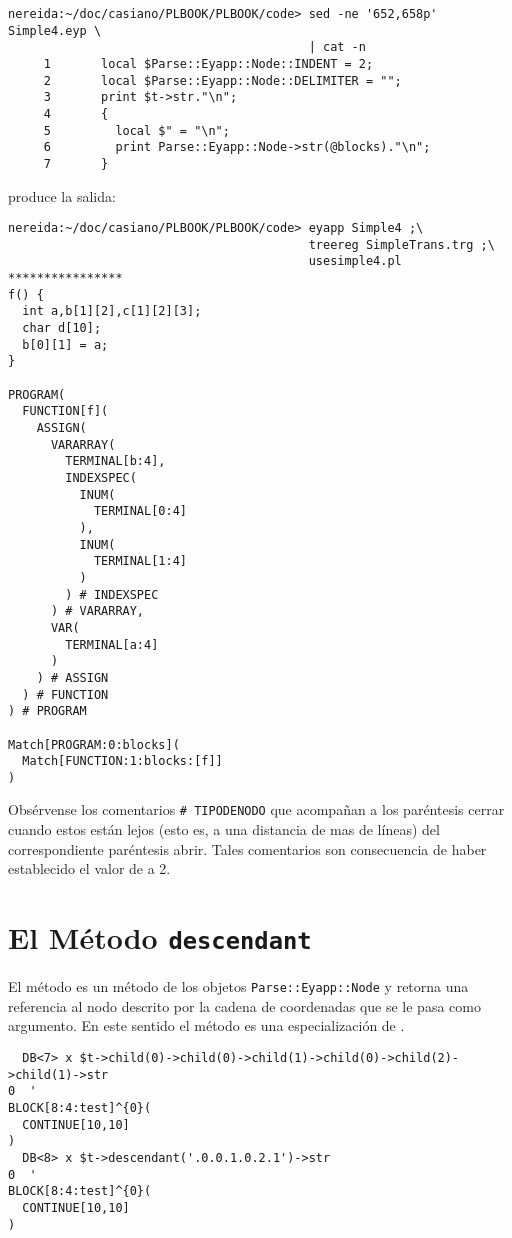 \label{code:indent2}
\begin{verbatim}
nereida:~/doc/casiano/PLBOOK/PLBOOK/code> sed -ne '652,658p' Simple4.eyp \
                                          | cat -n
     1       local $Parse::Eyapp::Node::INDENT = 2;
     2       local $Parse::Eyapp::Node::DELIMITER = "";
     3       print $t->str."\n";
     4       {
     5         local $" = "\n";
     6         print Parse::Eyapp::Node->str(@blocks)."\n";
     7       }
\end{verbatim}

produce la salida:

\begin{verbatim}
nereida:~/doc/casiano/PLBOOK/PLBOOK/code> eyapp Simple4 ;\
                                          treereg SimpleTrans.trg ;\
                                          usesimple4.pl
****************
f() {
  int a,b[1][2],c[1][2][3];
  char d[10];
  b[0][1] = a;
}

PROGRAM(
  FUNCTION[f](
    ASSIGN(
      VARARRAY(
        TERMINAL[b:4],
        INDEXSPEC(
          INUM(
            TERMINAL[0:4]
          ),
          INUM(
            TERMINAL[1:4]
          )
        ) # INDEXSPEC
      ) # VARARRAY,
      VAR(
        TERMINAL[a:4]
      )
    ) # ASSIGN
  ) # FUNCTION
) # PROGRAM

Match[PROGRAM:0:blocks](
  Match[FUNCTION:1:blocks:[f]]
)
\end{verbatim}

Obsérvense los comentarios \verb|# TIPODENODO| que acompañan a los paréntesis
cerrar cuando estos están lejos (esto es, a una distancia de mas de
 líneas) del correspondiente paréntesis abrir.
Tales comentarios son consecuencia de haber establecido el valor de 
\tei{\$Parse::Eyapp::Node::INDENT} a 2.

\section{El Método {\tt descendant}}
\label{secion:descendant}
El método  es un método de los objetos \verb|Parse::Eyapp::Node|
y retorna una referencia al nodo descrito por la cadena de coordenadas 
que se le pasa como argumento. En este sentido el método
\tei{child} es una especialización de \tei{descendant}.

\begin{verbatim}
  DB<7> x $t->child(0)->child(0)->child(1)->child(0)->child(2)->child(1)->str
0  '
BLOCK[8:4:test]^{0}(
  CONTINUE[10,10]
)
  DB<8> x $t->descendant('.0.0.1.0.2.1')->str
0  '
BLOCK[8:4:test]^{0}(
  CONTINUE[10,10]
)
\end{verbatim}


